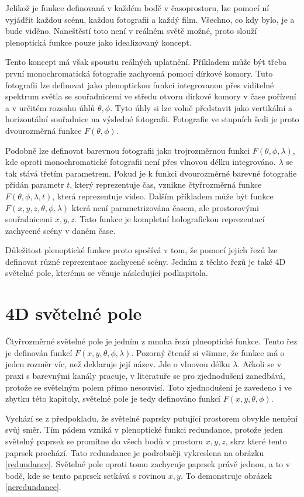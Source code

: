 Jelikož je funkce definovaná v každém bodě v časoprostoru, lze pomocí ní vyjádřit každou scénu, každou fotografii a každý film.
Všechno, co kdy bylo, je a bude viděno.
Naneštěstí toto není v reálném světě možné, proto slouží plenoptická funkce pouze jako idealizovaný koncept.

Tento koncept má však spoustu reálných uplatnění. Příkladem může být třeba první monochromatická fotografie zachycená pomocí dírkové komory.
Tuto fotografii lze definovat jako plenoptickou funkci integrovanou přes viditelné spektrum světla se souřadnicemi ve středu otvoru dírkové komory v čase pořízení a v určitém rozsahu úhlů $\theta, \phi$.
Tyto úhly si lze volně představit jako vertikální a horizontální souřadnice na výsledné fotografii.
Fotografie ve stupních šedi je proto dvourozměrná funkce $F(\theta, \phi)$.

Podobně lze definovat barevnou fotografii jako trojrozměrnou funkci $F(\theta, \phi, \lambda)$, kde oproti monochromatické fotografii není přes vlnovou délku integrováno.
$\lambda$ se tak stává třetím parametrem.
Pokud je k funkci dvourozměrné barevné fotografie přidán parametr $t$, který reprezentuje čas, vznikne čtyřrozměrná funkce $F(\theta, \phi, \lambda, t)$, která reprezentuje video.
Dalším příkladem může být funkce $F(x, y, z, \theta, \phi, \lambda)$ která není parametrizována časem, ale prostorovými souřadnicemi $x, y, z$.
Tato funkce je kompletní holografickou reprezentací zachycené scény v daném čase.

Důležitost plenoptické funkce proto spočívá v tom, že pomocí jejich řezů lze definovat různé reprezentace zachycené scény.
Jedním z těchto řezů je také 4D světelné pole, kterému se věnuje následující podkapitola.

\section{4D světelné pole}
\label{4D-light-field}
Čtyřrozměrné světelné pole je jedním z mnoha řezů plneoptické funkce.
Tento řez je definován funkcí $F(x, y, \theta, \phi, \lambda)$.
Pozorný čtenář si všimne, že funkce má o jeden rozměr víc, než deklaruje její název.
Jde o vlnovou délku $\lambda$.
Ačkoli se v praxi s barevnými kanály pracuje, v literatuře se pro zjednodušení zanedbává, protože se světelným polem přímo nesouvisí.
Toto zjednodušení je zavedeno i ve zbytku této kapitoly, světelné pole je tedy definováno funkcí $F(x, y, \theta, \phi)$.

Vychází se z předpokladu, že světelné paprsky putující prostorem obvykle nemění svůj směr.
Tím pádem vzniká v plenoptické funkci redundance, protože jeden světelný paprsek se promítne do všech bodů v prostoru $x, y, z$, skrz které tento paprsek prochází.
Tato redundance je podrobněji vykreslena na obrázku \ref{redundance}.
Světelné pole oproti tomu zachycuje paprsek právě jednou, a to v bodě, kde se tento paprsek setkává s rovinou $x, y$.
To demonstruje obrázek \ref{neredundance}.

